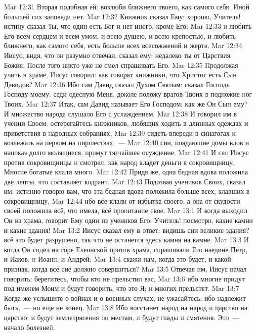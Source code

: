 \vs Mar 12:31 Вторая подобная ей: возлюби ближнего твоего, как самого себя. Иной большей сих заповеди нет.
\vs Mar 12:32 Книжник сказал Ему: хорошо, Учитель! истину сказал Ты, что один есть Бог и нет иного, кроме Его;
\vs Mar 12:33 и любить Его всем сердцем и всем умом, и всею душею, и всею крепостью, и любить ближнего, как самого себя, есть больше всех всесожжений и жертв.
\vs Mar 12:34 Иисус, видя, что он разумно отвечал, сказал ему: недалеко ты от Царствия Божия. После того никто уже не смел спрашивать Его.
\rsbpar\vs Mar 12:35 Продолжая учить в храме, Иисус говорил: как говорят книжники, что Христос есть Сын Давидов?
\vs Mar 12:36 Ибо сам Давид сказал Духом Святым: сказал Господь Господу моему: седи одесную Меня, доколе положу врагов Твоих в подножие ног Твоих.
\vs Mar 12:37 Итак, сам Давид называет Его Господом: как же Он Сын ему? И множество народа слушало Его с услаждением.
\vs Mar 12:38 И говорил им в учении Своем: остерегайтесь книжников, любящих ходить в длинных одеждах и  приветствия в народных собраниях,
\vs Mar 12:39 сидеть впереди в синагогах и возлежать на первом  на пиршествах,~---
\vs Mar 12:40 сии, поядающие домы вдов и напоказ долго молящиеся, примут тягчайшее осуждение.
\rsbpar\vs Mar 12:41 И сел Иисус против сокровищницы и смотрел, как народ кладет деньги в сокровищницу. Многие богатые клали много.
\vs Mar 12:42 Придя же, одна бедная вдова положила две лепты, что составляет кодрант.
\vs Mar 12:43 Подозвав учеников Своих,  сказал им: истинно говорю вам, что эта бедная вдова положила больше всех, клавших в сокровищницу,
\vs Mar 12:44 ибо все клали от избытка своего, а она от скудости своей положила всё, что имела, всё пропитание свое.
\vs Mar 13:1 И когда выходил Он из храма, говорит Ему один из учеников Его: Учитель! посмотри, какие камни и какие здания!
\vs Mar 13:2 Иисус сказал ему в ответ: видишь сии великие здания? всё это будет разрушено, так что не останется здесь камня на камне.
\vs Mar 13:3 И когда Он сидел на горе Елеонской против храма, спрашивали Его наедине Петр, и Иаков, и Иоанн, и Андрей:
\vs Mar 13:4 скажи нам, когда это будет, и какой признак, когда всё сие должно совершиться?
\vs Mar 13:5 Отвечая им, Иисус начал говорить: берегитесь, чтобы кто не прельстил вас,
\vs Mar 13:6 ибо многие придут под именем Моим и будут говорить, что это Я; и многих прельстят.
\vs Mar 13:7 Когда же услышите о войнах и о военных слухах, не ужасайтесь: ибо надлежит  быть,~--- но  еще не конец.
\vs Mar 13:8 Ибо восстанет народ на народ и царство на царство; и будут землетрясения по местам, и будут глады и смятения. Это~--- начало болезней.
